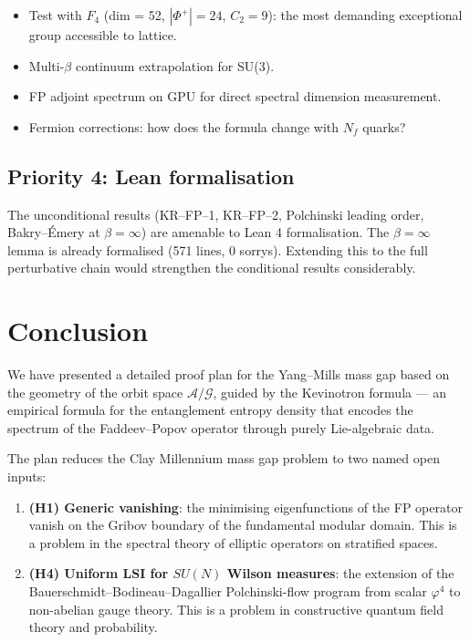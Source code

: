 \documentclass[11pt,a4paper]{amsart}
\theoremstyle{definition}
\theoremstyle{remark}
\newcommand{\calA}{\mathcal{A}}
\newcommand{\calG}{\mathcal{G}}
\newcommand{\PhiPlus}{\Phi^+}
\begin{document}
\begin{itemize}[leftmargin=1.5em]
\item Test with $F_4$ (dim = 52, $|\PhiPlus| = 24$, $C_2 = 9$): the most
      demanding exceptional group accessible to lattice.
\item Multi-$\beta$ continuum extrapolation for SU(3).
\item FP adjoint spectrum on GPU for direct spectral dimension measurement.
\item Fermion corrections: how does the formula change with $N_f$ quarks?
\end{itemize}

\subsection{Priority 4: Lean formalisation}

The unconditional results (KR--FP--1, KR--FP--2, Polchinski leading order,
Bakry--\'Emery at $\beta = \infty$) are amenable to Lean 4 formalisation.
The $\beta = \infty$ lemma is already formalised (571 lines, 0 sorrys).
Extending this to the full perturbative chain would strengthen the
conditional results considerably.

\section{Conclusion}\label{sec:conclusion}

We have presented a detailed proof plan for the Yang--Mills mass gap based
on the geometry of the orbit space $\calA/\calG$, guided by the Kevinotron
formula --- an empirical formula for the entanglement entropy density that
encodes the spectrum of the Faddeev--Popov operator through purely Lie-algebraic
data.

The plan reduces the Clay Millennium mass gap problem to two named open
inputs:
\begin{enumerate}[leftmargin=2.5em]
\item \textbf{(H1) Generic vanishing}: the minimising eigenfunctions of the
      FP operator vanish on the Gribov boundary of the fundamental modular
      domain. This is a problem in the spectral theory of elliptic operators
      on stratified spaces.
\item \textbf{(H4) Uniform LSI for $SU(N)$ Wilson measures}: the extension
      of the Bauerschmidt--Bodineau--Dagallier Polchinski-flow program from
      scalar $\varphi^4$ to non-abelian gauge theory. This is a problem
      in constructive quantum field theory and probability.
\end{enumerate}
\end{document}
